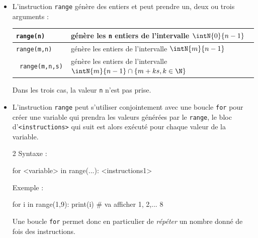 \documentclass[11pt,a4paper]{article}
\begin{document}
\begin{tcolorbox}[left=0cm,title=\bf{\faPython \; Boucles {\tt for} avec {\tt range}},colbacktitle=cfond]
\begin{itemize}
	\item[\textbullet] L'instruction {\tt range} génère des entiers et peut prendre un, deux ou trois arguments :
	\begin{tabularx}{\linewidth}{|>{\tt}l|X|}
		\hline
		range(n) & génère les {\tt n} entiers de l'intervalle $\intN{0}{n-1}$ \\
		\hline
		range(m,n) & génère les entiers de l'intervalle $\intN{m}{n-1}$ \\
		\hline
		range(m,n,s) & génère les entiers de l'intervalle $\intN{m}{n-1} \cap \{m+ks, k \in \N\}$ \\
		\hline
	\end{tabularx}
	{\small \danger \;} Dans les trois cas, la valeur {\tt n} n'est pas prise.
	\item[\textbullet] L'instruction {\tt range} peut s'utiliser conjointement avec une boucle {\tt for} pour créer une variable qui prendra les valeurs générées par le {\tt range}, le bloc d'{\tt <instructions>} qui suit est alors exécuté pour chaque valeur de la variable.
	\setlength{\multicolsep}{0pt}
	\begin{multicols}{2}
		Syntaxe :
		\begin{python} 
for <variable> in range(...):
	<instructions1>
		\end{python} 
		Exemple : 
		\begin{python} 
for i in range(1,9):
	print(i) # va afficher 1, 2,... 8
		\end{python}
	\end{multicols}
Une boucle {\tt for} permet donc en particulier de \textit{répéter} un nombre donné de fois des instructions.
\end{itemize}
\end{tcolorbox}
\end{document}
